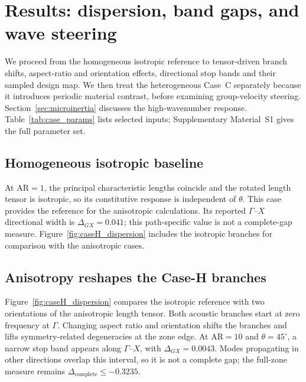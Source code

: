 \section{Results: dispersion, band gaps, and wave steering}
\label{sec:results}

We proceed from the homogeneous isotropic reference to tensor-driven branch shifts, aspect-ratio and orientation effects, directional stop bands and their sampled design map. We then treat the heterogeneous Case~C separately because it introduces periodic material contrast, before examining group-velocity steering. Section~\ref{sec:microinertia} discusses the high-wavenumber response. Table~\ref{tab:case_params} lists selected inputs; Supplementary Material~S1 gives the full parameter set.

\begin{table}[!tbp]
\centering
\caption{Selected material and numerical inputs for Cases H and C and the steering analysis.}
\label{tab:case_params}

\end{table}

\subsection{Homogeneous isotropic baseline}
At $\mathrm{AR}=1$, the principal characteristic lengths coincide and the rotated length tensor is isotropic, so its constitutive response is independent of $\theta$. This case provides the reference for the anisotropic calculations. Its reported $\Gamma$--$X$ directional width is $\Delta_{GX}=0.041$; this path-specific value is not a complete-gap measure. Figure~\ref{fig:caseH_dispersion} includes the isotropic branches for comparison with the anisotropic cases.

\subsection{Anisotropy reshapes the Case-H branches}
Figure~\ref{fig:caseH_dispersion} compares the isotropic reference with two orientations of the anisotropic length tensor. Both acoustic branches start at zero frequency at $\Gamma$. Changing aspect ratio and orientation shifts the branches and lifts symmetry-related degeneracies at the zone edge. At $\mathrm{AR}=10$ and $\theta=45^\circ$, a narrow stop band appears along $\Gamma$--$X$, with $\Delta_{GX}=0.0043$. Modes propagating in other directions overlap this interval, so it is not a complete gap; the full-zone measure remains $\Delta_{\mathrm{complete}}\le -0.3235$.

